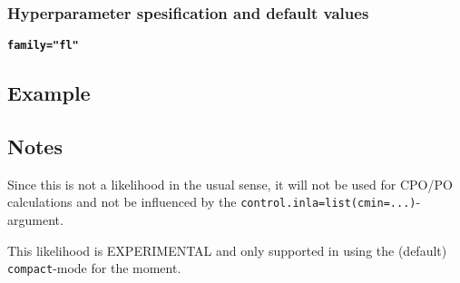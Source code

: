 \documentclass[a4paper,11pt]{article}
\begin{document}
\subsubsection*{Hyperparameter spesification and default values}

\textbf{\texttt{family="fl"}}


\subsection*{Example}



\subsection*{Notes}

Since this is not a likelihood in the usual sense, it will not be used
for CPO/PO calculations and not be influenced by the
\texttt{control.inla=list(cmin=...)}-argument.

This likelihood is EXPERIMENTAL and only supported in using the
(default) \texttt{compact}-mode for the moment.
\end{document}
